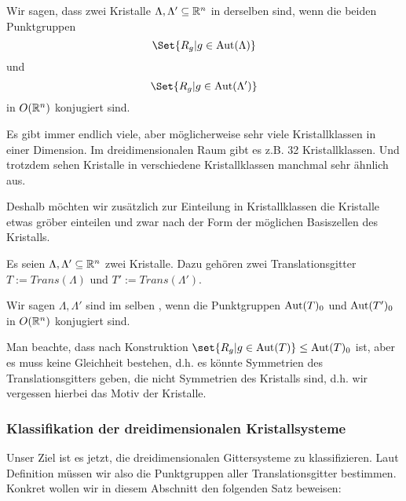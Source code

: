 \begin{definition}[Kristallklassen]
Wir sagen, dass zwei Kristalle $\Lambda,\Lambda'\subseteq\mathbb{R}^n$ in derselben  sind, wenn die beiden Punktgruppen
\[\Set{R_g | g\in\Aut(\Lambda)}\]
und
\[\Set{R_g | g\in\Aut(\Lambda')}\]
in $O(\mathbb{R}^n)$ konjugiert sind.
\end{definition}

\begin{remark}
Es gibt immer endlich viele, aber möglicherweise sehr viele Kristallklassen in einer Dimension. Im dreidimensionalen Raum gibt es z.B. 32 Kristallklassen. Und trotzdem sehen Kristalle in verschiedene Kristallklassen manchmal sehr ähnlich aus.

Deshalb möchten wir zusätzlich zur Einteilung in Kristallklassen die Kristalle etwas gröber einteilen und zwar nach der Form der möglichen Basiszellen des Kristalls.
\end{remark}

\begin{definition}[Gittersysteme]
Es seien $\Lambda, \Lambda' \subseteq\mathbb{R}^n$ zwei Kristalle. Dazu gehören zwei Translationsgitter $T:=Trans(\Lambda)$ und $T':=Trans(\Lambda')$.

Wir sagen $\Lambda,\Lambda'$ sind im selben , wenn die Punktgruppen $\operatorname{Aut}(T)_0$ und $\operatorname{Aut}(T')_0$ in $O(\mathbb{R}^n)$ konjugiert sind.
\end{definition}

\begin{remark}
Man beachte, dass nach Konstruktion $\set{R_g | g\in \Aut(T)} \leq \Aut(T)_0$ ist, aber es muss keine Gleichheit bestehen, d.h. es könnte Symmetrien des Translationsgitters geben, die nicht Symmetrien des Kristalls sind, d.h. wir vergessen hierbei das Motiv der Kristalle.
\end{remark}

\subsubsection{Klassifikation der dreidimensionalen Kristallsysteme}

\begin{remark}
Unser Ziel ist es jetzt, die dreidimensionalen Gittersysteme zu klassifizieren. Laut Definition müssen wir also die Punktgruppen aller Translationsgitter bestimmen. Konkret wollen wir in diesem Abschnitt den folgenden Satz beweisen:
\end{remark}

